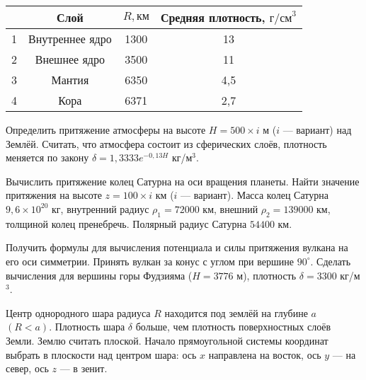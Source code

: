 \documentclass[11pt, a4paper,addpoints]{exam}
\theoremstyle{remark}
\begin{document}
\begin{questions}
    \begin{table}[h]
            \centering
            \begin{tabular}{|c|c|c|c|}
                \hline
                  & Слой & $R, \text{км}$ & Средняя плотность, $\text{г/см}^3$ \\\hline
                1 & Внутреннее ядро & 1300  & 13 \\\hline
                2 & Внешнее ядро & 3500  & 11 \\\hline
                3 & Мантия  & 6350  & 4,5 \\\hline
                4 & Кора & 6371  & 2,7 \\\hline
            \end{tabular}
        \end{table}
        \question[2] Определить притяжение атмосферы на высоте $H = 500 \times i$ м ($i$ --- вариант) над Землёй. Считать, что атмосфера состоит из сферических слоёв, плотность меняется по закону $\delta = 1,3333e^{-0,13H}$ кг/м$^3$. 
        
        \question[2] Вычислить притяжение колец Сатурна на оси вращения планеты. Найти значение притяжения на высоте $z = 100 \times i$ км ($i$ --- вариант). Масса колец Сатурна $9,6 \times 10^{20}$ кг, внутренний радиус $\rho_1 = 72 000$ км, внешний $\rho_2 = 139 000$ км, толщиной колец пренебречь. Полярный радиус Сатурна $54 400$ км.
        
        \question[2] Получить формулы для вычисления потенциала и силы притяжения вулкана на его оси симметрии. Принять вулкан за конус с углом при вершине $90^{\circ}$. Сделать вычисления для вершины горы Фудзияма ($H = 3776$ м), плотность $\delta = 3300$ кг/м$^3$.
              
        \question[3] Центр однородного шара радиуса $R$ находится под землёй на глубине $a$ $(R < a)$.
        Плотность шара $\delta$ больше, чем плотность поверхностных слоёв Земли. Землю считать плоской. Начало прямоугольной системы координат выбрать в плоскости над центром шара: ось $x$ направлена на восток, ось $y$ --- на север, ось $z$ --- в зенит.
\end{questions}
\end{document}
